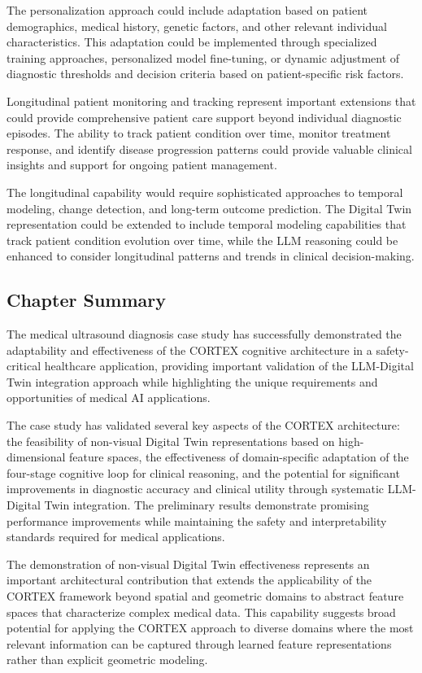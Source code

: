 The personalization approach could include adaptation based on patient demographics, medical history, genetic factors, and other relevant individual characteristics. This adaptation could be implemented through specialized training approaches, personalized model fine-tuning, or dynamic adjustment of diagnostic thresholds and decision criteria based on patient-specific risk factors.

Longitudinal patient monitoring and tracking represent important extensions that could provide comprehensive patient care support beyond individual diagnostic episodes. The ability to track patient condition over time, monitor treatment response, and identify disease progression patterns could provide valuable clinical insights and support for ongoing patient management.

The longitudinal capability would require sophisticated approaches to temporal modeling, change detection, and long-term outcome prediction. The Digital Twin representation could be extended to include temporal modeling capabilities that track patient condition evolution over time, while the LLM reasoning could be enhanced to consider longitudinal patterns and trends in clinical decision-making.

\subsection{Chapter Summary}

The medical ultrasound diagnosis case study has successfully demonstrated the adaptability and effectiveness of the CORTEX cognitive architecture in a safety-critical healthcare application, providing important validation of the LLM-Digital Twin integration approach while highlighting the unique requirements and opportunities of medical AI applications.

The case study has validated several key aspects of the CORTEX architecture: the feasibility of non-visual Digital Twin representations based on high-dimensional feature spaces, the effectiveness of domain-specific adaptation of the four-stage cognitive loop for clinical reasoning, and the potential for significant improvements in diagnostic accuracy and clinical utility through systematic LLM-Digital Twin integration. The preliminary results demonstrate promising performance improvements while maintaining the safety and interpretability standards required for medical applications.

The demonstration of non-visual Digital Twin effectiveness represents an important architectural contribution that extends the applicability of the CORTEX framework beyond spatial and geometric domains to abstract feature spaces that characterize complex medical data. This capability suggests broad potential for applying the CORTEX approach to diverse domains where the most relevant information can be captured through learned feature representations rather than explicit geometric modeling.

